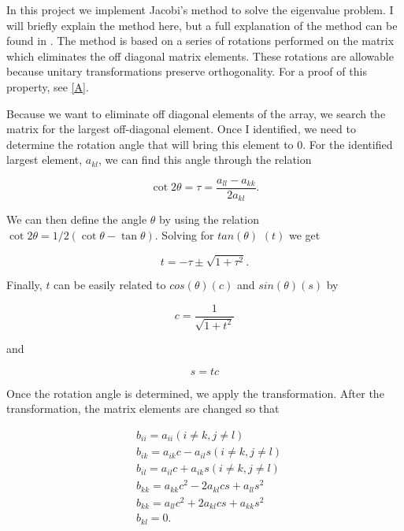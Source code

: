 \documentclass[%
oneside,                 %
final,                   %
10pt]{article}
\begin{document}
In this project we implement Jacobi's method to solve the eigenvalue problem.  I will briefly explain the method here, but a full explanation of the method can be found in \cite{LectureNotes}.  The method is based on a series of rotations performed on the matrix which eliminates the off diagonal matrix elements.  These rotations are allowable because unitary transformations preserve orthogonality.  For a proof of this property, see \ref{A}.

Because we want to eliminate off diagonal elements of the array, we search the matrix for the largest off-diagonal element.  Once I identified, we need to determine the rotation angle that will bring this element to 0.  For the identified largest element, $a_{kl}$, we can find this angle through the relation

\begin{equation*}
\cot 2\theta=\tau = \frac{a_{ll}-a_{kk}}{2a_{kl}}.
\end{equation*}

We can then define the angle $\theta$ by using the relation $\cot 2\theta=1/2(\cot \theta-\tan\theta)$.  Solving for $tan(\theta)$ $(t)$ we get

\begin{equation*}
  t = -\tau \pm \sqrt{1+\tau^2}.
\end{equation*}

Finally, $t$ can be easily related to $cos(\theta) (c)$ and $sin(\theta) (s)$ by

\begin{equation*}
   c = \frac{1}{\sqrt{1+t^2}}
\end{equation*}

and

\begin{equation*} 
s=tc
\end{equation*}

Once the rotation angle is determined, we apply the transformation.  After the transformation, the matrix elements are changed so that

\begin{equation*}
\begin{split}
& b_{ii}=a_{ii} (i \ne k, j \ne l) \\
& b_{ik}=a_{ik}c - a_{il}s  (i \ne k, j \ne l) \\
& b_{il}=a_{il}c + a_{ik}s  (i \ne k, j \ne l) \\
& b_{kk}=a_{kk}c^2 -2a_{kl}cs + a_{ll}s^2 \\
& b_{kk}=a_{ll}c^2 +2a_{kl}cs + a_{kk}s^2 \\
& b_{kl} = 0.
\end{split}
\end{equation*}
\end{document}
